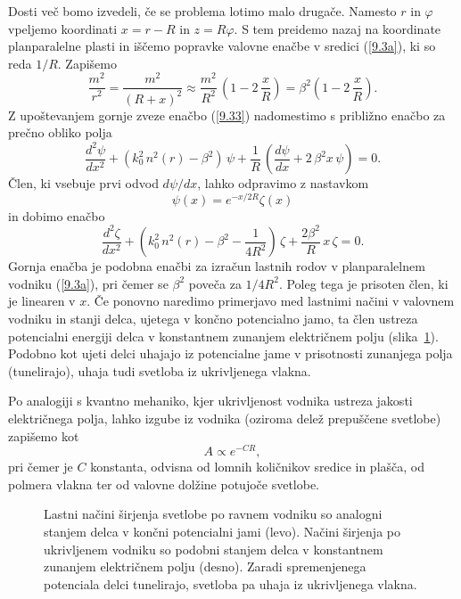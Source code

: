 Dosti več bomo izvedeli, če se problema lotimo malo drugače. Namesto $r$
in $\varphi$ vpeljemo koordinati $x=r-R$ in $z=R\varphi$.
S tem preidemo nazaj na koordinate planparalelne plasti in iščemo popravke valovne
enačbe v sredici (\ref{9.3a}), ki so reda $1/R.$ Zapišemo
\begin{equation}
\frac{m^{2}}{r^{2}}=\frac{m^{2}}{\left(R+x\right)^{2}}\approx\frac{m^{2}}
{R^{2}}\,\left(1-2\,\frac{x}{R}\right)=\beta^{2}\left(1-2\,\frac{x}{R}\right).
\label{9.34}
\end{equation}
Z upoštevanjem gornje zveze enačbo (\ref{9.33}) nadomestimo s približno enačbo za prečno obliko
polja 
\begin{equation}
\frac{d^{2}\psi}{dx^{2}}+\left(k_{0}^{2}\, n^{2}\left(r\right)-\beta^{2}\right)\,\psi+\frac{1}{R}\,
\left(\frac{d\psi}{dx}+2\,\beta^{2}x\,\psi\right)=0.
\label{9.35}
\end{equation}
Člen, ki vsebuje prvi odvod $d \psi/d x$, lahko odpravimo z nastavkom 
\begin{equation}
\psi(x) = e^{-x/2R} \zeta(x)
\end{equation}
in dobimo enačbo
\begin{equation}
\frac{d^{2}\zeta}{dx^{2}}+\left(k_{0}^{2}\, n^{2}\left(r\right)-\beta^{2}-\frac{1}{4R^2}\right)\,\zeta
+ \frac{2\beta^{2}}{R}\,x\,\zeta=0.
\label{9.35a}
\end{equation}
Gornja enačba je podobna enačbi za izračun lastnih rodov v planparalelnem
vodniku (\ref{9.3a}), pri čemer se $\beta^2$ poveča za $1/4R^2$. Poleg tega je prisoten
člen, ki je linearen v $x$. Če ponovno naredimo primerjavo
med lastnimi načini v valovnem vodniku in stanji delca, ujetega v končno potencialno jamo, 
ta člen ustreza potencialni energiji delca v konstantnem zunanjem električnem 
polju (slika~\ref{fig:tunel}). Podobno kot ujeti delci uhajajo iz potencialne jame
v prisotnosti zunanjega polja (tunelirajo), uhaja tudi svetloba iz ukrivljenega vlakna.

Po analogiji s kvantno mehaniko, kjer ukrivljenost vodnika ustreza jakosti električnega polja,
lahko izgube iz vodnika (oziroma delež prepuščene svetlobe) zapišemo kot 
\begin{equation}
A \propto e^{-CR},
\end{equation}
pri čemer je $C$ konstanta, odvisna od lomnih količnikov sredice in plašča, od polmera vlakna 
ter od valovne dolžine potujoče svetlobe.
\begin{figure}[h]
\centering
\def\svgwidth{120truemm} 
 
\caption{Lastni načini širjenja svetlobe po ravnem vodniku so analogni stanjem 
delca v končni potencialni jami (levo). Načini širjenja po ukrivljenem vodniku
so podobni stanjem delca v konstantnem zunanjem električnem polju (desno). Zaradi
spremenjenega potenciala delci tunelirajo, svetloba pa uhaja iz ukrivljenega vlakna.}
\label{fig:tunel}
\end{figure}

